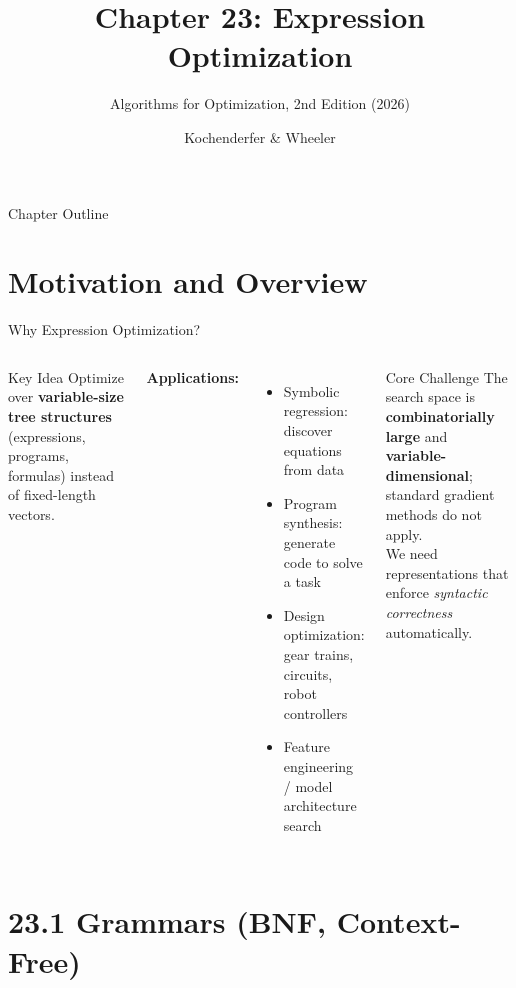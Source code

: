 \documentclass[aspectratio=169,10pt]{beamer}
\title[Ch.\ 23: Expression Optimization]{\textbf{Chapter 23: Expression Optimization}}
\subtitle{Algorithms for Optimization, 2nd Edition (2026)}
\author{Kochenderfer \& Wheeler}
\institute{Lecture Slides}
\date{}
\begin{document}

\begin{frame}
  \titlepage
\end{frame}

\begin{frame}{Chapter Outline}
  \tableofcontents
\end{frame}

\section{Motivation and Overview}

\begin{frame}{Why Expression Optimization?}
  \begin{columns}[T]
    \begin{block}{Key Idea}
      Optimize over \textbf{variable-size tree structures} (expressions,
      programs, formulas) instead of fixed-length vectors.
    \end{block}
    \bigskip
    \textbf{Applications:}
    \begin{itemize}
      \item Symbolic regression: discover equations from data
      \item Program synthesis: generate code to solve a task
      \item Design optimization: gear trains, circuits, robot controllers
      \item Feature engineering / model architecture search
    \end{itemize}
    \begin{exampleblock}{Core Challenge}
      The search space is \textbf{combinatorially large} and
      \textbf{variable-dimensional}; standard gradient methods
      do not apply. \\[4pt]
      We need representations that enforce
      \emph{syntactic correctness} automatically.
    \end{exampleblock}
  \end{columns}
\end{frame}

\section{23.1 Grammars (BNF, Context-Free)}
\end{document}
